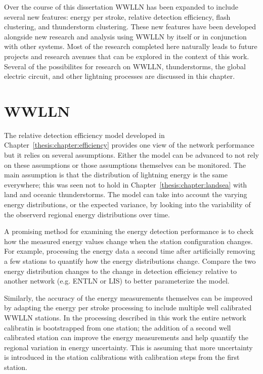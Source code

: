 Over the course of this dissertation WWLLN has been expanded to include several new features: energy per stroke, relative detection efficiency, flash clustering, and thunderstorm clustering.
These new features have been developed alongside new research and analysis using WWLLN by itself or in conjunction with other systems.
Most of the research completed here naturally leads to future projects and research avenues that can be explored in the context of this work.
Several of the possibilites for research on WWLLN, thunderstorms, the global electric circuit, and other lightning processes are discussed in this chapter.

\section{WWLLN}

The relative detection efficiency model developed in Chapter~\ref{thesis:chapter:efficiency} provides one view of the network performance but it relies on several assumptions.
Either the model can be advanced to not rely on these assumptions or those assumptions themselves can be monitored.
The main assumption is that the distribution of lightning energy is the same everywhere; this was seen not to hold in Chapter~\ref{thesis:chapter:landsea} with land and oceanic thunderstorms.
The model can take into account the varying energy distributions, or the expected variance, by looking into the variability of the observerd regional energy distributions over time.

A promising method for examining the energy detection performance is to check how the measured energy values change when the station configuration changes.
For example, processing the energy data a second time after artificially removing a few stations to quantify how the energy distributions change.
Compare the two energy distribution changes to the change in detection efficiency relative to another network (e.g. ENTLN or LIS) to better parameterize the model.

Similarly, the accuracy of the energy measurements themselves can be improved by adapting the energy per stroke processing to include multiple well calibrated WWLLN stations.
In the processing described in this work the entire network calibratin is bootstrapped from one station; the addition of a second well calibrated station can improve the energy measurements and help quantify the regional variation in energy uncertainty.
This is assuming that more uncertainty is introduced in the station calibrations with calibration steps from the first station.

